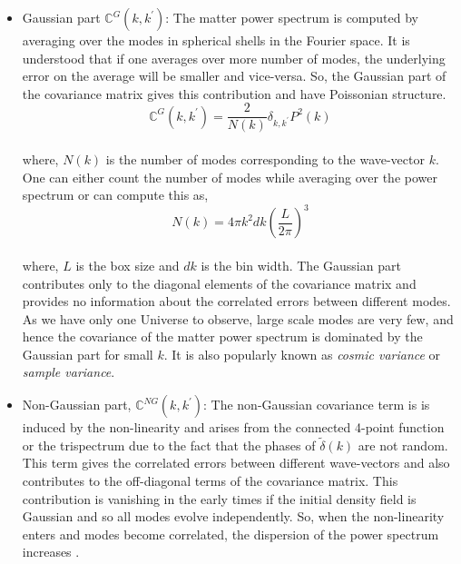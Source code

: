 \begin{itemize}
	\item Gaussian part $\mathbb{C}^{G}(k,k^{\prime})$: The matter power spectrum is computed
			by averaging over the modes in spherical shells in the Fourier space. It 
			is understood that if one averages over more number of modes, the underlying
			error on the average will be smaller and vice-versa. So, the Gaussian part
			of the covariance matrix gives this contribution and have Poissonian
			structure. 
			\begin{equation}
				\mathbb{C}^{G}(k,k^{\prime}) = \dfrac{2}{N(k)} \delta_{k,k^{\prime}} P^2(k)
			\end{equation}
			\\
			where, $N(k)$ is the number of modes corresponding to the wave-vector $k$. One 
			can either count the number of modes while averaging over the power spectrum
			or can compute this as,
			\begin{equation}
				N(k) = 4 \pi k^2 dk \left( \dfrac{L}{2\pi} \right)^3
			\end{equation}
			\\
			where, $L$ is the box size and $dk$ is the bin width. The Gaussian part 
			contributes only to the diagonal elements of the covariance matrix and provides no 
			information about the correlated errors between different modes. As we have
			only one Universe to observe, large scale modes are very few, and hence
			the covariance of the matter power spectrum is dominated by the Gaussian
			part for small $k$. It is also popularly known as {\it cosmic variance}
			or {\it sample variance}.

	\item Non-Gaussian part, $\mathbb{C}^{NG}(k,k^{\prime})$: The non-Gaussian covariance term is 
			is induced by the non-linearity and arises from the connected 4-point function or the trispectrum due to the fact that the phases of $\tilde{\delta}(k)$ are 
			not random. This term gives the correlated errors between
			different wave-vectors and also contributes to the off-diagonal terms
			of the covariance matrix. This contribution is vanishing in the early 
			times if the initial density field is Gaussian and so all modes evolve
			independently. So, when the non-linearity enters and modes become
			correlated, the dispersion of the power spectrum increases 
			\cite{1999MNRAS.308.1179M}.


\end{itemize}
